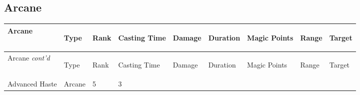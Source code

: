 \documentclass[twoside]{book}
\begin{document}
    

\subsection{Arcane}
    
\begin{longtable}{p{1.25in}lp{2em}p{3em}llp{7em}ll} 
  Arcane& \begin{turn}{70}{Type}\end{turn}
          & \begin{turn}{70}{Rank}\end{turn}
          & \begin{turn}{70}{Casting Time}\end{turn}
          & \begin{turn}{70}{Damage}\end{turn}
          & \begin{turn}{70}{Duration}\end{turn}
          & \begin{turn}{70}{Magic Points}\end{turn}
          & \begin{turn}{70}{Range}\end{turn}
          & \begin{turn}{70}{Target}\end{turn}
          \\
  \hline
  \hline
  \endfirsthead
  Arcane \textit{cont'd}
        & \begin{turn}{70}{Type}\end{turn}
          & \begin{turn}{70}{Rank}\end{turn}
          & \begin{turn}{70}{Casting Time}\end{turn}
          & \begin{turn}{70}{Damage}\end{turn}
          & \begin{turn}{70}{Duration}\end{turn}
          & \begin{turn}{70}{Magic Points}\end{turn}
          & \begin{turn}{70}{Range}\end{turn}
          & \begin{turn}{70}{Target}\end{turn}
           \\
  \hline
  \endhead
\raggedright Advanced Haste & Arcane & 5 & 3

\end{longtable}
\end{document}

